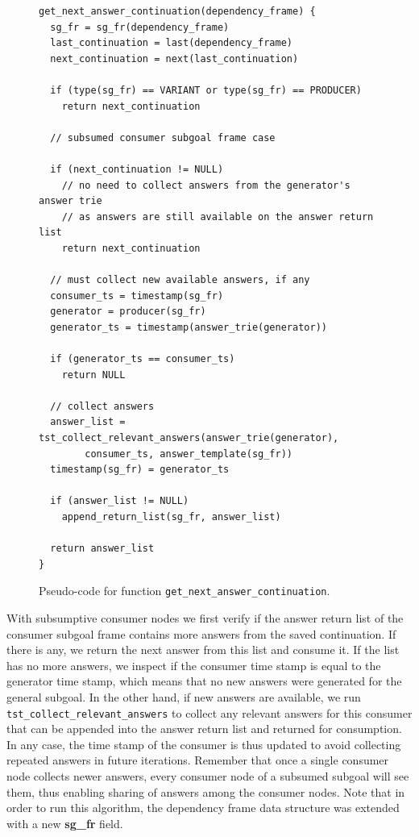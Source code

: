 \begin{figure}[ht]
\begin{Verbatim}
get_next_answer_continuation(dependency_frame) {
  sg_fr = sg_fr(dependency_frame)
  last_continuation = last(dependency_frame)
  next_continuation = next(last_continuation)
  
  if (type(sg_fr) == VARIANT or type(sg_fr) == PRODUCER)
    return next_continuation
  
  // subsumed consumer subgoal frame case
  
  if (next_continuation != NULL)
    // no need to collect answers from the generator's answer trie
    // as answers are still available on the answer return list
    return next_continuation
  
  // must collect new available answers, if any
  consumer_ts = timestamp(sg_fr)
  generator = producer(sg_fr)
  generator_ts = timestamp(answer_trie(generator))
      
  if (generator_ts == consumer_ts)
    return NULL
        
  // collect answers
  answer_list = tst_collect_relevant_answers(answer_trie(generator),
        consumer_ts, answer_template(sg_fr))
  timestamp(sg_fr) = generator_ts
      
  if (answer_list != NULL)
    append_return_list(sg_fr, answer_list)
      
  return answer_list
}
\end{Verbatim}
\caption{Pseudo-code for function \texttt{get\_next\_answer\_continuation}.}
\label{fig:get_next_answer_continuation}
\end{figure}

With subsumptive consumer nodes we first verify if the answer return list of the
consumer subgoal frame contains more answers from the saved continuation. If there is
any, we return the next answer from this list and consume it. If the list has no more answers,
we inspect if the consumer time stamp is equal to the generator time stamp, which means
that no new answers were generated for the general subgoal. In the other hand, if new
answers are available, we run \texttt{tst\_collect\_relevant\_answers} to collect any
relevant answers for this consumer that can be appended into the answer return list
and returned for consumption.
In any case, the time stamp of the consumer is thus updated to avoid collecting
repeated answers in future iterations. Remember that once a single consumer node
collects newer answers, every consumer node of a subsumed subgoal will see them, thus
enabling sharing of answers among the consumer nodes.
Note that in order to run this algorithm, the dependency frame data structure was extended
with a new \textbf{sg\_fr} field.

